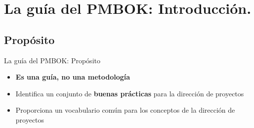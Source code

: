 \section{La guía del PMBOK: Introducción.}

\subsection{Propósito}
\begin{frame}{La guía del PMBOK: Propósito}
	
	\begin{itemize}
		\item{\textbf{Es una guía, no una metodología}}
		\item{Identifica un conjunto de \textbf{buenas prácticas} para la dirección de proyectos}
		\item{Proporciona un vocabulario común para los conceptos de la dirección de proyectos}
	\end{itemize}
\end{frame}

